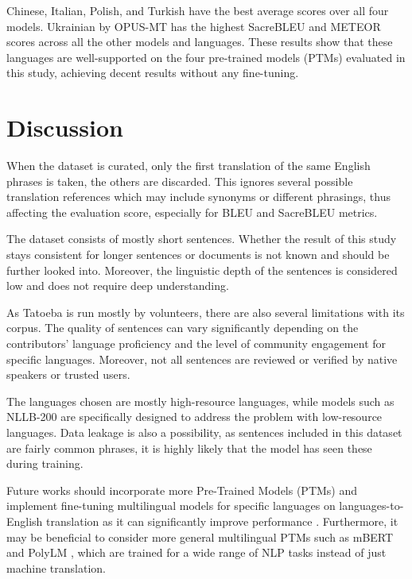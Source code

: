 \documentclass[a4paper, 11pt]{article}
\begin{document}
Chinese, Italian, Polish, and Turkish have the best average scores over all four models. Ukrainian by OPUS-MT has the highest SacreBLEU and METEOR scores across all the other models and languages. These results show that these languages are well-supported on the four pre-trained models (PTMs) evaluated in this study, achieving decent results without any fine-tuning.


\section{Discussion}

When the dataset is curated, only the first translation of the same English phrases is taken, the others are discarded. This ignores several possible translation references which may include synonyms or different phrasings, thus affecting the evaluation score, especially for BLEU and SacreBLEU metrics.

The dataset consists of mostly short sentences. Whether the result of this study stays consistent for longer sentences or documents is not known and should be further looked into. Moreover, the linguistic depth of the sentences is considered low and does not require deep understanding.

As Tatoeba \cite{tatoeba} is run mostly by volunteers, there are also several limitations with its corpus. The quality of sentences can vary significantly depending on the contributors' language proficiency and the level of community engagement for specific languages. Moreover, not all sentences are reviewed or verified by native speakers or trusted users.

The languages chosen are mostly high-resource languages, while models such as NLLB-200 \cite{nllb200-2020} are specifically designed to address the problem with low-resource languages. Data leakage is also a possibility, as sentences included in this dataset are fairly common phrases, it is highly likely that the model has seen these during training.

Future works should incorporate more Pre-Trained Models (PTMs) and implement fine-tuning multilingual models for specific languages on languages-to-English translation as it can significantly improve performance \cite{zhang-2023-fine-tuning}. Furthermore, it may be beneficial to consider more general multilingual PTMs such as mBERT \cite{wu-2020-mbert-are-all} and PolyLM \cite{wei-2023-polylm}, which are trained for a wide range of NLP tasks instead of just machine translation.

\printbibliography
\end{document}
